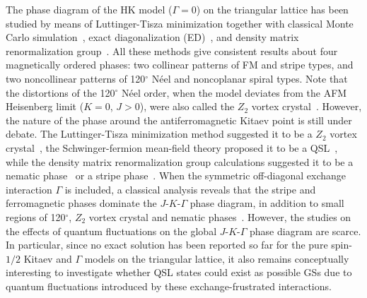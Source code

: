 \documentclass[aps,prb,reprint,amsfonts,amsmath,amssymb,showpacs,groupedaddress,superscriptaddress]{revtex4-1}
\begin{document}
The phase diagram of the HK model ($\Gamma=0$) on the triangular lattice has been studied by means of Luttinger-Tisza minimization together with classical Monte Carlo simulation~\cite{PhysRevB.93.104417}, exact diagonalization (ED)~\cite{PhysRevB.91.155135,KaiLi2015}, and density matrix renormalization group~\cite{JPSJ.85.114710,PhysRevX.9.021017}. All these methods give consistent results about four magnetically ordered phases: two collinear patterns of FM and stripe types, and two noncollinear patterns of 120$^\circ$ N\'{e}el and noncoplanar spiral types. Note that the distortions of the 120$^\circ$ N\'{e}el order, when the model deviates from the AFM Heisenberg limit ($K=0$, $J>0$), were also called the $Z_{2}$ vortex crystal~\cite{PhysRevB.93.104417,PhysRevB.91.155135,JPSJ.85.114710}. However, the nature of the phase around the antiferromagnetic Kitaev point is still under debate. The Luttinger-Tisza minimization method suggested it to be a $Z_{2}$ vortex crystal~\cite{PhysRevB.93.104417}, the Schwinger-fermion mean-field theory proposed it to be a QSL~\cite{KaiLi2015}, while the density matrix renormalization group calculations suggested it to be a nematic phase~\cite{PhysRevB.91.155135,JPSJ.85.114710} or a stripe phase~\cite{PhysRevX.9.021017}. When the symmetric off-diagonal exchange interaction $\Gamma$ is included, a classical analysis reveals that the stripe and ferromagnetic phases dominate the $J$-$K$-$\Gamma$ phase diagram, in addition to small regions of 120$^\circ$, $Z_{2}$ vortex crystal and nematic phases~\cite{PhysRevB.92.165108}. However, the studies on the effects of quantum fluctuations on the global $J$-$K$-$\Gamma$ phase diagram are scarce. In particular, since no exact solution has been reported so far for the pure spin-$1/2$ Kitaev and $\Gamma$ models on the triangular lattice, it also remains conceptually interesting to investigate whether QSL states could exist as possible GSs due to quantum fluctuations introduced by these exchange-frustrated interactions.
\end{document}
